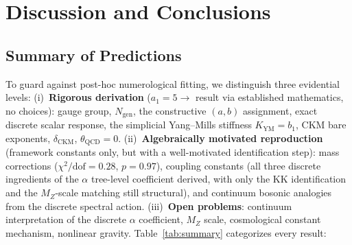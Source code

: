 \documentclass[12pt,a4paper]{article}
\theoremstyle{definition}
\begin{document}
\section{Discussion and Conclusions}
\label{sec:discussion}

\subsection{Summary of Predictions}

To guard against post-hoc numerological fitting, we distinguish three evidential levels: (i)~\textbf{Rigorous derivation} ($a_1 = 5 \to$ result via established mathematics, no choices): gauge group, $N_{\text{gen}}$, the constructive $(a,b)$ assignment, exact discrete scalar response, the simplicial Yang--Mills stiffness $K_{\mathrm{YM}} = b_1$, CKM bare exponents, $\delta_{\text{CKM}}$, $\theta_{\text{QCD}} = 0$.  (ii)~\textbf{Algebraically motivated reproduction} (framework constants only, but with a well-motivated identification step): mass corrections ($\chi^2/\text{dof} = 0.28$, $p = 0.97$), coupling constants (all three discrete ingredients of the $\alpha$ tree-level coefficient derived, with only the KK identification and the $M_Z$-scale matching still structural), and continuum bosonic analogies from the discrete spectral action.  (iii)~\textbf{Open problems}: continuum interpretation of the discrete $\alpha$ coefficient, $M_Z$ scale, cosmological constant mechanism, nonlinear gravity.  Table~\ref{tab:summary} categorizes every result:
\end{document}
